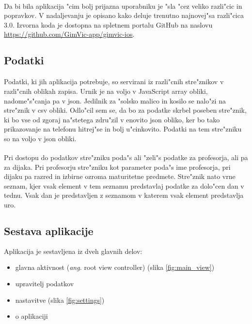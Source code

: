 \paragraph{}Da bi bila aplikacija "cim bolj prijazna uporabniku je "sla "cez veliko razli"cic in popravkov. V nadaljevanju je opisano kako deluje trenutno najnovej"sa razli"cica 3.0. Izvorna koda je dostopna na spletnem portalu GitHub na naslovu \url{https://github.com/GimVic-app/gimvic-ios}.

\subsection{Podatki} 
\paragraph{}Podatki, ki jih aplikacija potrebuje, so servirani iz razli"cnih stre"znikov v razli"cnih oblikah zapisa. Urnik je na voljo v JavaScript array obliki, nadome"s"canja pa v json\cite{json-wiki}. Jedilnik za "solsko malico in kosilo se nalo"zi na stre"znik v csv obliki. Odlo"cil sem se, da bo za podatke skrbel poseben stre"znik, ki bo vse od zgoraj na"stetega zdru"zil v enovito json obliko, ker bo tako prikazovanje na telefonu hitrej"se in bolj u"cinkovito. Podatki na tem stre"zniku so na voljo v json obliki.

\paragraph{}Pri dostopu do podatkov stre"zniku poda"s ali "zeli"s podatke za profesorja, ali pa za dijaka. Pri profesorju stre"zniku kot parameter poda"s ime profesorja, pri dijaku pa razred in izbirne ozroma maturitetne predmete. Stre"znik nato vrne seznam, kjer vsak element v tem seznamu predstavlaj podatke za dolo"cen dan v tednu. Vsak dan je predstavljen z seznamom v katerem vsak element predstavlja uro.

\newpage
\subsection{Sestava aplikacije}
Aplikacija je sestavljena iz dveh glavnih delov:
\begin{itemize}
	\setlength\itemsep{0em}
	\item glavna aktivnost (\textit{ang.} root view controller) (slika \ref{fig:main_view})
	\item upravitelj podatkov
	\item nastavitve (slika \ref{fig:settings})
	\item o aplikaciji
\end{itemize}

